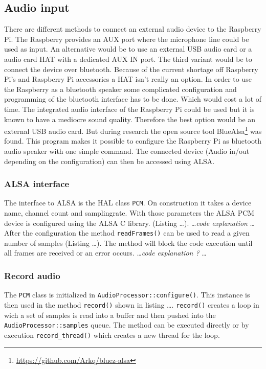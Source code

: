\subsection{Audio input}\label{sec:software:rec}
%
There are different methods to connect an external audio device to the Raspberry Pi. The Raspberry provides an AUX port where the microphone line could be used as input. An alternative would be to use an external USB audio card or a audio card HAT with a dedicated AUX IN port. The third variant would be to connect the device over bluetooth.\p
%
Because of the current shortage off Raspberry Pi's and Raspberry Pi accessories a HAT isn't really an option. In order to use the Raspberry as a bluetooth speaker some complicated configuration and programming of the bluetooth interface has to be done. Which would cost a lot of time. The integrated audio interface of the Raspberry Pi could be used but it is known to have a mediocre sound quality. Therefore the best option would be an external USB audio card. But during research the open source tool BlueAlsa\footnote{\href{https://github.com/Arkq/bluez-alsa}{https://github.com/Arkq/bluez-alsa}} was found. This program makes it possible to configure the Raspberry Pi as bluetooth audio speaker with one simple command. The connected device (Audio in/out depending on the configuration) can then be accessed using ALSA.
%
\subsubsection*{ALSA interface}

The interface to ALSA is the HAL class \lstinline{PCM}. On construction it takes a device name, channel count and samplingrate. With those parameters the ALSA PCM device is configured using the ALSA C library. (Listing \dots).\p
%
\dots \textit{code explanation} \dots\p
%
After the configuration the method \lstinline{readFrames()} can be used to read a given number of samples (Listing \dots). The method will block the code execution until all frames are received or an error occurs.
%
\dots \textit{code explanation ?} \dots
%
\subsubsection*{Record audio}
%
The \lstinline{PCM} class is initialized in \lstinline{AudioProcessor::configure()}. This instance is then used in the method \lstinline{record()} shown in listing \dots. \lstinline{record()} creates a loop in wich a set of samples is read into a buffer and then pushed into the \lstinline{AudioProcessor::samples} queue. The method can be executed directly or by execution \lstinline{record_thread()} which creates a new thread for the loop.